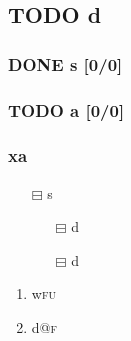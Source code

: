\documentclass[11pt]{article}
\begin{document}
\subsection{{\bfseries\sffamily TODO} d}
\label{sec:orgc63b06b}
\subsubsection{{\bfseries\sffamily DONE} s [0/0]}
\label{sec:org62369eb}

\subsubsection{{\bfseries\sffamily TODO} a [0/0]}
\label{sec:orgbf053bf}

\subsubsection{xa}
\label{sec:orgb253b41}
\begin{itemize}
\item[{$\boxminus$}] s
\begin{itemize}
\item[{$\boxminus$}] d
\item[{$\boxminus$}] d
\end{itemize}
\end{itemize}
\begin{enumerate}
\item w\hfill{}\textsc{fu}
\label{sec:org5e08f05}

\item d\hfill{}\textsc{@f}
\label{sec:org6b72a93}
\end{enumerate}

\label{errr}

\begin{fff}
  
\end{fff}

\end{document}
